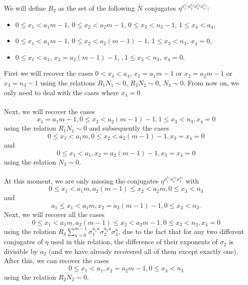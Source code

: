 We will define $B_2$ as the set of the following $N$ conjugates $\eta^{\sigma_1^{x_1}\sigma_2^{x_2}\sigma_3^{x_3}\sigma_4^{x_4}}$:
\begin{itemize}
\item $0\le x_1 <a_1m-1$, $ 0\le x_2 < a_2m-1$, $ 0 \le x_3<n_3-1$, $ 1\le x_4<a_4$,
\item $0\le x_1 < a_1m-1$, $ 0\le x_2 < a_2(m-1)-1$, $ 1\leq x_3 < n_3$, $ x_4=0$,
\item $0\le x_1 < a_1$, $ x_2=a_2(m-1)-1$, $, 1\leq x_3 < n_3$, $ x_4=0$.
\end{itemize}

First we will recover the cases $0<x_4<a_4$, $x_1=a_1m-1$ or $x_2=a_2m-1$ or $x_3=n_3-1$ using the relations $R_1N_1\sim 0$, $ R_2N_2\sim 0$, $ N_3\sim 0$. From now on, we only need to deal with the cases where $x_4=0$.
\paragraph*{}
Next, we will recover the cases $$x_1=a_1m-1, 0\le x_2 < a_2(m-1)-1, 1\leq x_3 <n_3, x_4=0$$ using the relation $R_1N_1\sim 0$ and subsequently the cases $$0\leq x_1 < a_1m,  0\le x_2 < a_2(m-1)-1, x_3 = x_4=0$$ and $$0\le x_1 < a_1, x_2 = a_2(m-1)-1, x_3 = x_4=0$$ using the relation $N_3\sim 0$.

\paragraph*{}
At this moment, we are only missing the conjugates $\eta^{\sigma_1^{x_1}\sigma_2^{x_2}\sigma_3^{x_3}}$ with $$0\le x_1< a_1m, a_2(m-1)\le x_2 <a_2m, 0\le x_3<n_3$$ and $$a_1\le x_1< a_1m, x_2=a_2(m-1)-1, 0\le x_3<n_3.$$
Next, we will recover all the cases $$0\leq x_1 < a_1m, a_2(m-1)\leq x_2 < a_2m-1, 0\leq x_3 <n_3,x_4=0$$ %
using the relation $R_4\sum_{u=0}^{m-1}\sigma_1^{a_1u}\sigma_2^{a_2u}\sigma_3^u$, due to the fact that for any two different conjugates of $\eta$ used in this relation, the difference of their exponents of $\sigma_2$ is divisible by $a_2$ (and we have already recovered all of them except exactly one). %
 After this, we can recover the cases $$0\leq x_1 < a_1, x_2 = a_2m-1, 0\leq x_3 <n_3$$ using the relation $R_2N_2\sim 0$.
